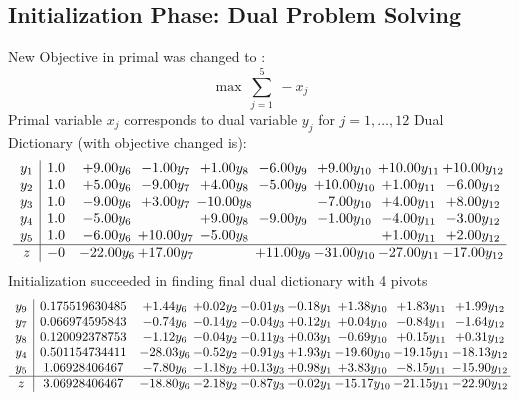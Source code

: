 \documentclass[8pt]{article}
\begin{document}
\subsection{Initialization Phase: Dual Problem Solving}
New Objective in primal was changed to : \[ \max\ \sum_{j=1}^{5}\ - x_j \] 
Primal variable $x_j$ corresponds to dual variable $y_j$ for $j = 1,\ldots,12$
Dual Dictionary (with objective changed is): 
\[\begin{array}{c| c c@{\hskip 2pt} c@{\hskip 2pt} c@{\hskip 2pt} c@{\hskip 2pt} c@{\hskip 2pt} c@{\hskip 2pt} c@{\hskip 2pt} }
 y_{1}   &  1.0 & +  9.00 y_{6} & -1.00 y_{7} & +  1.00 y_{8} & -6.00 y_{9} & +  9.00 y_{10} & + 10.00 y_{11} & + 10.00 y_{12}\\
 y_{2}   &  1.0 & +  5.00 y_{6} & -9.00 y_{7} & +  4.00 y_{8} & -5.00 y_{9} & + 10.00 y_{10} & +  1.00 y_{11} & -6.00 y_{12}\\
 y_{3}   &  1.0 & -9.00 y_{6} & +  3.00 y_{7} & -10.00 y_{8} &   & -7.00 y_{10} & +  4.00 y_{11} & +  8.00 y_{12}\\
 y_{4}   &  1.0 & -5.00 y_{6} &   & +  9.00 y_{8} & -9.00 y_{9} & -1.00 y_{10} & -4.00 y_{11} & -3.00 y_{12}\\
 y_{5}   &  1.0 & -6.00 y_{6} & + 10.00 y_{7} & -5.00 y_{8} &    &   & +  1.00 y_{11} & +  2.00 y_{12}\\
\hline
z    &  -0 & -22.00 y_{6} & + 17.00 y_{7} &   & + 11.00 y_{9} & -31.00 y_{10} & -27.00 y_{11} & -17.00 y_{12}\\
\end{array}\]
Initialization succeeded in finding final dual dictionary with 4 pivots
\[\begin{array}{c| c c@{\hskip 2pt} c@{\hskip 2pt} c@{\hskip 2pt} c@{\hskip 2pt} c@{\hskip 2pt} c@{\hskip 2pt} c@{\hskip 2pt} }
 y_{9}   &  0.175519630485 & +  1.44 y_{6} & +  0.02 y_{2} & -0.01 y_{3} & -0.18 y_{1} & +  1.38 y_{10} & +  1.83 y_{11} & +  1.99 y_{12}\\
 y_{7}   &  0.066974595843 & -0.74 y_{6} & -0.14 y_{2} & -0.04 y_{3} & +  0.12 y_{1} & +  0.04 y_{10} & -0.84 y_{11} & -1.64 y_{12}\\
 y_{8}   &  0.120092378753 & -1.12 y_{6} & -0.04 y_{2} & -0.11 y_{3} & +  0.03 y_{1} & -0.69 y_{10} & +  0.15 y_{11} & +  0.31 y_{12}\\
 y_{4}   &  0.501154734411 & -28.03 y_{6} & -0.52 y_{2} & -0.91 y_{3} & +  1.93 y_{1} & -19.60 y_{10} & -19.15 y_{11} & -18.13 y_{12}\\
 y_{5}   &  1.06928406467 & -7.80 y_{6} & -1.18 y_{2} & +  0.13 y_{3} & +  0.98 y_{1} & +  3.83 y_{10} & -8.15 y_{11} & -15.90 y_{12}\\
\hline
z    &  3.06928406467 & -18.80 y_{6} & -2.18 y_{2} & -0.87 y_{3} & -0.02 y_{1} & -15.17 y_{10} & -21.15 y_{11} & -22.90 y_{12}\\
\end{array}\]
\end{document}
